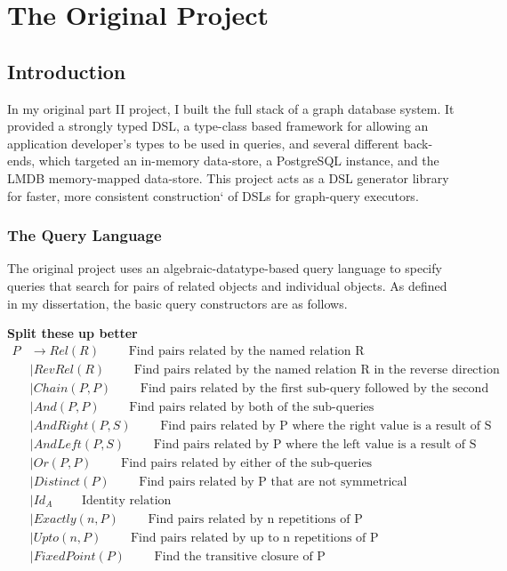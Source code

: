 \documentclass{report}
\newcommand \2[0]{\textbf{2}}
\newcommand \3[0]{\textbf{3}}
\newcommand{\todo}[1]{\textbf{#1}}
\begin{document}
\tableofcontents
\newpage

\chapter{The Original Project}
\section{Introduction}
In my original part II project, I built the full stack of a graph database system. It provided a strongly typed DSL, a type-class based framework for allowing an application developer's types to be used in queries, and several different back-ends, which targeted an in-memory data-store, a PostgreSQL instance, and the LMDB memory-mapped data-store. This project acts as a DSL generator library for faster, more consistent construction` of DSLs for graph-query executors.
\subsection{The Query Language}\label{LangDef}
The original project uses an algebraic-datatype-based query language to specify queries that search for pairs of related objects and individual objects. As defined in my dissertation, the basic query constructors are as follows.

\todo{Split these up better}
\begin{equation}\label{PairQueries}
    \begin{split}
    P  &\rightarrow Rel(R) \quad\quad\text{ Find pairs related by the named relation R}\\
    &\mid RevRel(R) \quad\quad\text{ Find pairs related by the named relation R in the reverse direction}\\
    &\mid Chain(P, P) \quad\quad\text{   Find pairs related by the first sub-query followed by the second}\\
    &\mid And(P, P) \quad\quad\text{  Find pairs related by both of the sub-queries}\\
    &\mid AndRight(P, S) \quad\quad\text{  Find pairs related by P where the right value is a result of S}\\
    &\mid AndLeft(P, S) \quad\quad\text{  Find pairs related by P where the left value is a result of S}\\
    &\mid Or(P, P) \quad\quad\text{  Find pairs related by either of the sub-queries}\\
    &\mid Distinct(P) \quad\quad\text{  Find pairs related by P that are not symmetrical}\\
    &\mid Id_A \quad\quad\text{ Identity relation}\\
    &\mid Exactly(\mathit{n}, P) \quad\quad\text{  Find pairs related by n repetitions of P}\\
    &\mid Upto(\mathit{n}, P) \quad\quad\text{  Find pairs related by up to n repetitions of P}\\
    &\mid FixedPoint(P) \quad\quad\text{  Find the transitive closure of P}\\
    \end{split}
    \end{equation} 
\end{document}
